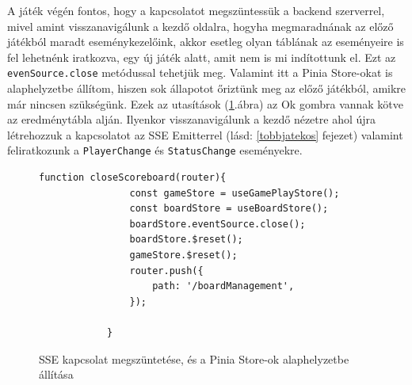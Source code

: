 \documentclass[a4paper,twoside]{article}
\begin{document}
A játék végén fontos, hogy a kapcsolatot megszüntessük a backend szerverrel, mivel amint visszanavigálunk a kezdő oldalra, hogyha megmaradnának az előző játékból maradt eseménykezelőink, akkor esetleg olyan táblának az eseményeire is fel lehetnénk iratkozva, egy új játék alatt, amit nem is mi indítottunk el. Ezt az \verb|evenSource.close| metódussal tehetjük meg. Valamint itt a Pinia Store-okat is alaphelyzetbe állítom, hiszen sok állapotot őriztünk meg az előző játékból, amikre már nincsen szükségünk. Ezek az utasítások (\ref{reset}.ábra) az Ok gombra vannak kötve az eredménytábla alján. Ilyenkor visszanavigálunk a kezdő nézetre ahol újra létrehozzuk a kapcsolatot az SSE Emitterrel (lásd: \ref{tobbjatekos} fejezet) valamint feliratkozunk a \verb|PlayerChange| és \verb|StatusChange| eseményekre.  
\begin{figure}
	\caption{SSE kapcsolat megszüntetése, és a Pinia Store-ok alaphelyzetbe állítása}
	\begin{minipage}{\textwidth}
		\begin{lstlisting}[style=javascriptStyle]
			function closeScoreboard(router){
				const gameStore = useGamePlayStore();
				const boardStore = useBoardStore();
				boardStore.eventSource.close();
				boardStore.$reset();
				gameStore.$reset();
				router.push({
					path: '/boardManagement',
				});
				
			}
		\end{lstlisting}
	\end{minipage}
	
	\label{reset}
\end{figure}
\FloatBarrier
\end{document}
